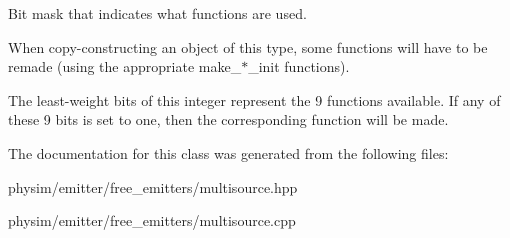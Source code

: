 Bit mask that indicates what functions are used. 

When copy-\/constructing an object of this type, some functions will have to be remade (using the appropriate make\+\_\+$\ast$\+\_\+init functions).

The least-\/weight bits of this integer represent the 9 functions available. If any of these 9 bits is set to one, then the corresponding function will be made. 

The documentation for this class was generated from the following files\+:\begin{DoxyCompactItemize}
\item 
physim/emitter/free\+\_\+emitters/multisource.\+hpp\item 
physim/emitter/free\+\_\+emitters/multisource.\+cpp\end{DoxyCompactItemize}
